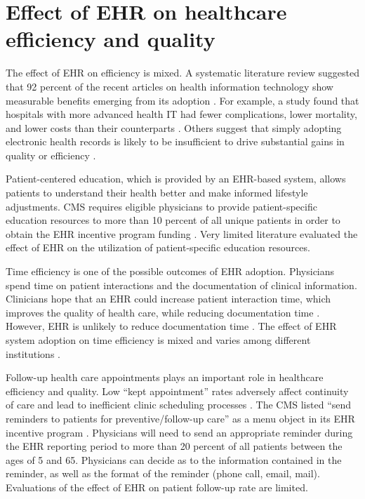 \documentclass[12pt]{report}
\begin{document}
\section{Effect of EHR on healthcare efficiency and quality}

The effect of EHR on efficiency is mixed. A systematic literature review suggested that 92 percent of the recent articles on health information technology show measurable benefits emerging from its adoption \citep{Buntin2011}. For example, a study found that hospitals with more advanced health IT had fewer complications, lower mortality, and lower costs than their counterparts \citep{amarasingham2009clinical}. Others suggest that simply adopting electronic health records is likely to be insufficient to drive substantial gains in quality or efficiency \citep{DesRoches2010}. 

Patient-centered education, which is provided by an EHR-based system, allows patients to understand their health better and make informed lifestyle adjustments. CMS requires eligible physicians to provide patient-specific education resources to more than 10 percent of all unique patients in order to obtain the EHR incentive program funding \citep{healthit05}. Very limited literature evaluated the effect of EHR on the utilization of patient-specific education resources. 

Time efficiency is one of the possible outcomes of EHR adoption. Physicians spend time on patient interactions and the documentation of clinical information. Clinicians hope that an EHR could increase patient interaction time, which improves the quality of health care, while reducing documentation time \citep{leung2003incentives}. However, EHR is unlikely to reduce documentation time \citep{poissant2005impact}. The effect of EHR system adoption on time efficiency is mixed and varies among different institutions \citep{makoul2001use, Chaudhry2006}. 

Follow-up health care appointments plays an important role in healthcare efficiency and quality. Low ``kept appointment'' rates adversely affect continuity of care and lead to inefficient clinic scheduling processes \citep{myers2001strategies}. The CMS listed ``send reminders to patients for preventive/follow-up care'' as a menu object in its EHR incentive program \citep{cmsincentive14}. Physicians will need to send an appropriate reminder during the EHR reporting period to more than 20 percent of all patients between the ages of 5 and 65. Physicians can decide as to the information contained in the reminder, as well as the format of the reminder (phone call, email, mail). Evaluations of the effect of EHR on patient follow-up rate are limited.
\end{document}
